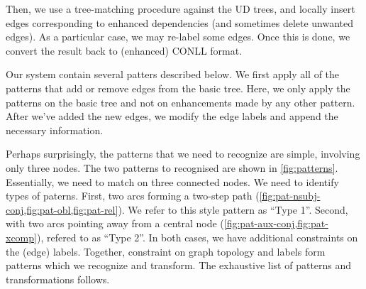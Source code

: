 \documentclass[11pt,a4paper]{article}
\begin{document}
Then, we use a tree-matching procedure against the UD trees, and
locally insert edges corresponding to enhanced dependencies (and
sometimes delete unwanted edges). As a particular case, we may
re-label some edges. Once this is done, we convert the result back to
(enhanced) CONLL format.

Our system contain several patters described below. We first apply
all of the patterns that add or remove edges from the basic
tree. Here, we only apply the patterns on the basic tree and not
on enhancements made by any other pattern. After we've added the
new edges, we modify the edge labels and append the necessary
information.

Perhaps surprisingly, the patterns that we need to recognize are
simple, involving only three nodes. The two patterns to recognised are
shown in \cref{fig:patterns}. Essentially, we need to match on three
connected nodes.  We need to identify types of paterns. First, two
arcs forming a two-step path
(\cref{fig:pat-nsubj-conj,fig:pat-obl,fig:pat-rel}). We refer to this
style pattern as ``Type 1''.  Second, with two arcs pointing away from
a central node (\cref{fig:pat-aux-conj,fig:pat-xcomp}), refered to as
``Type 2''.
In both cases, we have additional constraints on the (edge) labels. Together, constraint
on graph topology and labels form patterns which we recognize and transform.
The exhaustive list of patterns and transformations follows.
\end{document}
